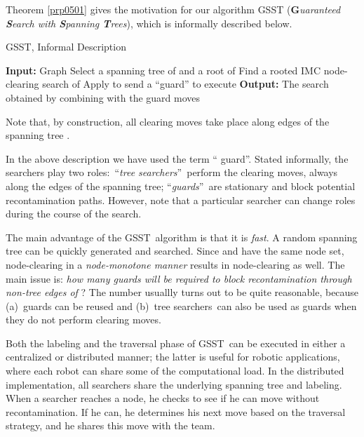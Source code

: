 \documentclass[11pt]{article}\usepackage{amsmath}
\begin{document}
Theorem \ref{prp0501} gives the motivation for our algorithm GSST
(\textbf{G}\emph{uaranteed \textbf{S}earch with \textbf{S}panning
\textbf{T}rees}), which is informally described below.

\begin{algorithm}[h]
\caption{ GSST, Informal Description}
\begin{algorithmic}
\STATE \textbf{Input:} Graph 
\STATE Select a spanning tree  of  and a root  of 
\STATE Find a rooted IMC node-clearing search  of 
\STATE Apply  to 
\STATE send a ``guard'' to 
\STATE execute 
\ENDIF
\STATE \textbf{Output:} The search  obtained by combining  with the guard moves
\end{algorithmic}
\label{alg:random}
\end{algorithm}


Note that, by construction, all clearing moves take place along edges of the
spanning tree .

In the above description we have used the term \textquotedblleft
guard\textquotedblright. Stated informally, the searchers play two
roles:\ \textquotedblleft\emph{tree searchers}\textquotedblright\ perform the
clearing moves, always along the edges of the spanning tree; \textquotedblleft \emph{guards}\textquotedblright\ are stationary and block potential
recontamination paths. However, note that a particular searcher can change
roles during the course of the search.

The main advantage of the GSST\ algorithm is that it is \emph{fast}. A random
spanning tree  can be quickly generated and searched. Since
 and  have the same node set, node-clearing
 in a \emph{node-monotone manner} results in node-clearing
 as well. The main issue is: \emph{how many guards will be
required to block recontamination through non-tree edges of }? The number
usuallly turns out to be quite reasonable, because (a)\ guards can be reused
and (b)\ tree searchers\ can also be used as guards when they do not perform
clearing moves.

Both the labeling and the traversal phase of GSST\ can be executed in either a
centralized or distributed manner; the latter is useful for robotic
applications, where each robot can share some of the computational load. In
the distributed implementation, all searchers share the underlying spanning
tree and labeling. When a searcher reaches a node, he checks to see if he can
move without recontamination. If he can, he determines his next move based on
the traversal strategy, and he shares this move with the team.
\end{document}
